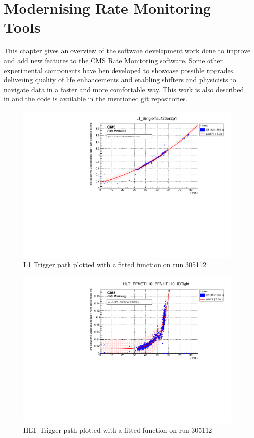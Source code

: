 \chapter{Modernising Rate Monitoring Tools}

This chapter gives an overview of the software development work done to improve and add new features to the CMS Rate Monitoring software. Some other experimental components have ben developed to showcase possible upgrades, delivering quality of life enhancements and enabling shifters and physicists to navigate data in a faster and more comfortable way. This work is also described in \cite{VivaceRTM1} \cite{VivaceRTM2} \cite{L1TriggerOMSDevelopments} \cite{MohrmanRTM} and the code is available in the mentioned git repositories.

\begin{figure}
	\centerline{
		\includegraphics[width=0.6\paperwidth]{figures/RMT_305112_L1_SingleTau120er2p1.pdf}}
	\caption{L1 Trigger path plotted with a fitted function on run 305112}
	\label{fig:ratemon_l1}
\end{figure}

\begin{figure}
	\centerline{
		\includegraphics[width=0.6\paperwidth]{figures/RMT_305112_HLT_PFMET110_PFMHT110_IDTight.pdf}}
	\caption{HLT Trigger path plotted with a fitted function on run 305112}
	\label{fig:ratemon_hlt}
\end{figure}


